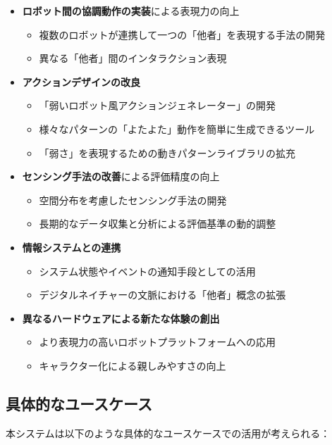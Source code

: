 \documentclass{cuxarticle}
\begin{document}
\begin{itemize}
  \item \textbf{ロボット間の協調動作の実装}による表現力の向上
    \begin{itemize}
      \item 複数のロボットが連携して一つの「他者」を表現する手法の開発
      \item 異なる「他者」間のインタラクション表現
    \end{itemize}

  \item \textbf{アクションデザインの改良}
    \begin{itemize}
      \item 「弱いロボット風アクションジェネレーター」の開発
      \item 様々なパターンの「よたよた」動作を簡単に生成できるツール
      \item 「弱さ」を表現するための動きパターンライブラリの拡充
    \end{itemize}

  \item \textbf{センシング手法の改善}による評価精度の向上
    \begin{itemize}
      \item 空間分布を考慮したセンシング手法の開発
      \item 長期的なデータ収集と分析による評価基準の動的調整
    \end{itemize}

  \item \textbf{情報システムとの連携}
    \begin{itemize}
      \item システム状態やイベントの通知手段としての活用
      \item デジタルネイチャーの文脈における「他者」概念の拡張
    \end{itemize}

  \item \textbf{異なるハードウェアによる新たな体験の創出}
    \begin{itemize}
      \item より表現力の高いロボットプラットフォームへの応用
      \item キャラクター化による親しみやすさの向上
    \end{itemize}
\end{itemize}

\subsection{具体的なユースケース}
本システムは以下のような具体的なユースケースでの活用が考えられる：
\end{document}
